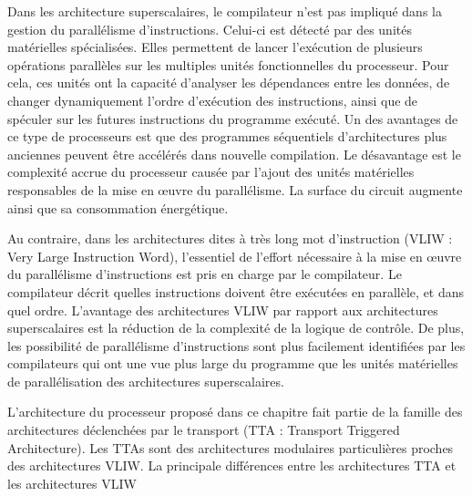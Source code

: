 Dans les architecture superscalaires, le compilateur n'est pas impliqué dans la gestion du parallélisme d'instructions. Celui-ci est détecté par des unités matérielles spécialisées. 
Elles permettent de lancer l'exécution de plusieurs opérations parallèles sur les multiples unités fonctionnelles du processeur.
Pour cela, ces unités ont la capacité d'analyser les dépendances entre les données, de changer dynamiquement l'ordre d'exécution des instructions, ainsi que de spéculer sur les futures instructions du programme exécuté. 
Un des avantages de ce type de processeurs est que des programmes séquentiels d'architectures plus anciennes peuvent être accélérés dans nouvelle compilation. Le désavantage est le complexité accrue du processeur causée par l'ajout des unités matérielles responsables de la mise en œuvre du parallélisme. La surface du circuit augmente ainsi que sa consommation énergétique.

Au contraire, dans les architectures dites \og à très long mot d'instruction \fg (VLIW : Very Large Instruction Word), l'essentiel de l'effort nécessaire à la mise en œuvre du parallélisme d'instructions est pris en charge par le compilateur. Le compilateur décrit quelles instructions doivent être exécutées en parallèle, et dans quel ordre. L'avantage des architectures VLIW par rapport aux architectures superscalaires est la réduction de la complexité de la logique de contrôle. De plus, les possibilité de parallélisme d'instructions sont plus facilement identifiées par les compilateurs qui ont une vue plus large du programme que les unités matérielles de parallélisation des architectures superscalaires.

L'architecture du processeur proposé dans ce chapitre fait partie de la famille des architectures déclenchées par le transport (TTA : Transport Triggered Architecture). Les TTAs sont des architectures modulaires particulières proches des architectures VLIW. La principale différences entre les architectures TTA et les architectures VLIW 


